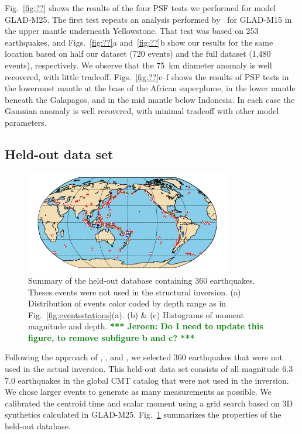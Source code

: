 \documentclass[extra,mreferee]{gji}
\newcommand{\green}[1]{\textbf{\textcolor{Green}{#1}}}
\newcommand{\tojeroen}[1]{\textbf{\green{*** Jeroen: #1 ***}}}
\begin{document}
Fig.~\ref{fig:??} shows the results of the four PSF tests we performed for model GLAD-M25.
The first test repeats an analysis performed by~\cite{bozdaug2016global} for GLAD-M15 in the upper mantle underneath Yellowstone.
That test was based on 253 earthquakes,
and Figs.~\ref{fig:??}a and~\ref{fig:??}b show our results for the same location based on half our dataset (720 events) and the full dataset (1,480 events), respectively.
We observe that the 75~km diameter anomaly is well recovered, with little tradeoff.
Figs.~\ref{fig:??}c--f shows the results of PSF tests in the lowermost mantle at the base of the African superplume,
in the lower mantle beneath the Galapagos,
and in the mid mantle below Indonesia.
In each case the Gaussian anomaly is well recovered, with minimal tradeoff with other model parameters.

\subsection{Held-out data set}

\begin{figure}
  \centering
  \includegraphics[width=0.8\textwidth]{figures/events_360.pdf}
  \caption{\small{Summary of the held-out database containing 360 earthquakes. Theses events were not used in the structural inversion. (a) Distribution of events color coded by depth range as in Fig.~\ref{fig:eventsstations}(a). (b) \& (c) Histograms of moment magnitude and depth. \tojeroen{Do I need to update this figure, to remove subfigure b and c?} }}
  \label{fig:events_360}
\end{figure}

Following the approach of \cite{tape2009adjoint}, \cite{chen2015multiparameter},
and \cite{bozdaug2016global}, we selected 360 earthquakes that were not used
in the actual inversion. This held-out data set consists of all magnitude 6.3--7.0
earthquakes in the global CMT catalog that were not used in the inversion.
We chose larger events to generate as many measurements as possible.
We calibrated the centroid time and scalar moment using a grid search based on
3D synthetics calculated in GLAD-M25.
Fig.~\ref{fig:events_360} summarizes the properties of the held-out database.
\end{document}
